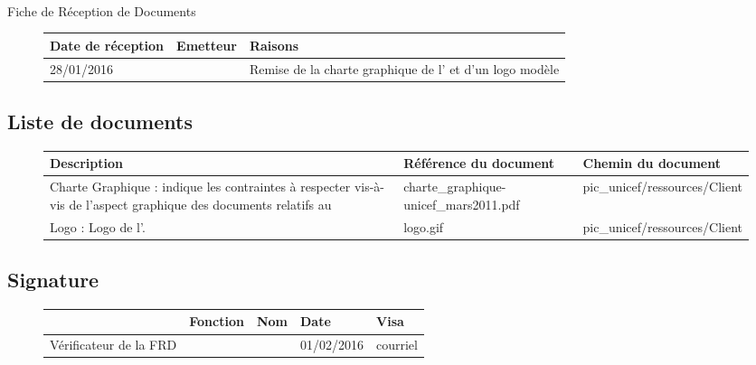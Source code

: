 \documentclass[asi, sansVersion]{picInsa}
\begin{document}
\begin{center}
\huge
\nomEquipe{}\\
Fiche de Réception de Documents\\
\end{center}
\vspace{0.5cm}


\begin{figure}[H]
		\centering
		\begin{tabularx}{17cm}{|X|X|X|}
		\hline
		\rowcolor[gray]{0.85}Date de réception & Emetteur & Raisons \\
		\hline
		28/01/2016 & \nomClient{} & Remise de la charte graphique de l'\nomClient{} et d'un logo modèle\\
		\hline
		\end{tabularx}
\end{figure}

\subsection*{Liste de documents}

\begin{figure}[H]
		\centering
		\begin{tabularx}{17cm}{|X|X|X|}
		\hline
		\rowcolor[gray]{0.85} Description & Référence du document & Chemin du document\\
		\hline
		Charte Graphique : indique les contraintes à respecter vis-à-vis de l'aspect graphique des documents relatifs au \Client{} & charte\_graphique-unicef\_mars2011.pdf & pic\_unicef/ressources/Client \\
		\hline
		Logo \nomClient{} : Logo de l'\nomClient. & logo.gif & pic\_unicef/ressources/Client\\
		\hline
		\end{tabularx}
\end{figure}

\subsection*{Signature}

\begin{figure}[H]
		\centering
		\begin{tabularx}{17cm}{|p{4cm}|X|X|X|X|}
		\hline
		\rowcolor[gray]{0.85}& Fonction & Nom & Date & Visa \\
		\hline
		 Vérificateur de la FRD & \RGC & \Mathieu & 01/02/2016 & courriel \\
		\hline
		\end{tabularx}
\end{figure}
\end{document}
